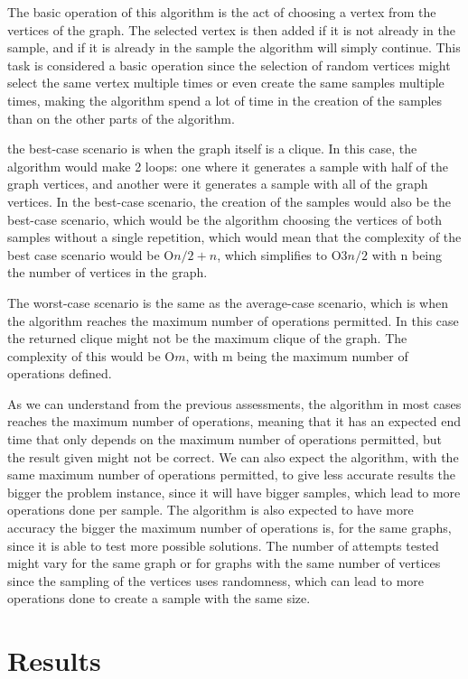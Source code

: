 \documentclass[]{revdetua}
\begin{document}
The basic operation of this algorithm is the act of choosing a vertex from the vertices of the graph. The selected vertex is then added if it is not already in the sample, and if it is already in the sample the algorithm will simply continue. This task is considered a basic operation since the selection of random vertices might select the same vertex multiple times or even create the same samples multiple times, making the algorithm spend a lot of time in the creation of the samples than on the other parts of the algorithm.

the best-case scenario is when the graph itself is a clique. In this case, the algorithm would make 2 loops: one where it generates a sample with half of the graph vertices, and another were it generates a sample with all of the graph vertices. In the best-case scenario, the creation of the samples would also be the best-case scenario, which would be the algorithm choosing the vertices of both samples without a single repetition, which would mean that the complexity of the best case scenario would be O\( n/2 + n \), which simplifies to O\(3n/2\) with n being the number of vertices in the graph.    

The worst-case scenario is the same as the average-case scenario, which is when the algorithm reaches the maximum number of operations permitted. In this case the returned clique might not be the maximum clique of the graph. The complexity of this would be O\(m\), with m being the maximum number of operations defined.

As we can understand from the previous assessments, the algorithm in most cases reaches the maximum number of operations, meaning that it has an expected end time that only depends on the maximum number of operations permitted, but the result given might not be correct. We can also expect the algorithm, with the same maximum number of operations permitted, to give less accurate results the bigger the problem instance, since it will have bigger samples, which lead to more operations done per sample. The algorithm is also expected to have more accuracy the bigger the maximum number of operations is, for the same graphs, since it is able to test more possible solutions. The number of attempts tested might vary for the same graph or for graphs with the same number of vertices since the sampling of the vertices uses randomness, which can lead to more operations done to create a sample with the same size.

\section{Results}
\end{document}
